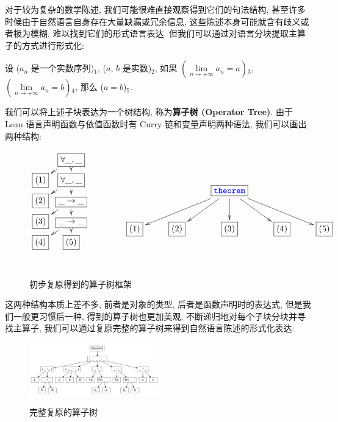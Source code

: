 \documentclass[UTF8]{ctexart}
\DeclareMathOperator{\0}{\mathbf{0}}                    %
\newcommand{\<}{\langle}
\renewcommand{\>}{\rangle}                              %
\theoremstyle{MyStyle} %
\newcommand*{\lean}[1]{\texttt{\color{blue}#1}}
\begin{document}
        对于较为复杂的数学陈述, 我们可能很难直接观察得到它们的句法结构, 甚至许多时候由于自然语言自身存在大量缺漏或冗余信息, 这些陈述本身可能就含有歧义或者极为模糊, 难以找到它们的形式语言表达. 但我们可以通过对语言分块提取主算子的方式进行形式化: 

        设 ($a_n$ 是一个实数序列)$_1$, ($a$, $b$ 是实数)$_2$, 如果 \(\left(\lim\limits_{n\to+\infty} a_n = a\right)\)$_3$, \(\left(\lim\limits_{n\to+\infty} a_n = b\right)\)$_4$, 那么 ($a=b$)$_5$. 

        我们可以将上述子块表达为一个树结构, 称为\textbf{算子树 (Operator Tree)}. 由于 Lean 语言声明函数与依值函数时有 Curry 链和变量声明两种语法, 我们可以画出两种结构: 
        
        \begin{figure}[htbp]
            \[\xymatrix@=1.5pt{
                & \boxed{\forall\_, \_}\ar[dl]\ar[d]\\
                \boxed{(1)} & \boxed{\forall\_, \_}\ar[dl]\ar[d]\\
                \boxed{(2)} & \boxed{\_\to\_}\ar[dl]\ar[d]\\
                \boxed{(3)} & \boxed{\_\to\_}\ar[dl]\ar[d]\\
                \boxed{(4)} & \boxed{(5)}
            }\qquad\qquad
            \xymatrix{
                \\
                & & \boxed{\lean{theorem}}\ar[dll]\ar[dl]\ar[d]\ar[dr]\ar[drr]\\
                \boxed{(1)} & \boxed{(2)} & \boxed{(3)} & \boxed{(4)} & \boxed{(5)}
            }\]
            \label{fig:OperatorTree1}\
            \caption{初步复原得到的算子树框架}
        \end{figure}

        这两种结构本质上差不多, 前者是对象的类型, 后者是函数声明时的表达式, 但是我们一般更习惯后一种, 得到的算子树也更加美观. 不断递归地对每个子块分块并寻找主算子, 我们可以通过复原完整的算子树来得到自然语言陈述的形式化表达: 

        \begin{figure}[htbp]
            \centering
            \includegraphics[width=0.5\textwidth]{figures/operator tree.png}
            \label{fig:OperatorTree2}
            \caption{完整复原的算子树}
        \end{figure}
\end{document}
